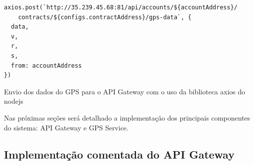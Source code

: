 \clearpage
\begin{code}
\begin{verbatim}
axios.post(`http://35.239.45.68:81/api/accounts/${accountAddress}/
	contracts/${configs.contractAddress}/gps-data`, {
  data,
  v,
  r,
  s,
  from: accountAddress
})
\end{verbatim}
\caption{Envio dos dados do GPS para o API Gateway com o uso da biblioteca axios do nodejs}
\label{lst:scih_gps_sim_diff}
\end{code}

	Nas próximas seções será detalhado a implementação dos principais componentes do sistema: API Gateway e GPS Service.

\subsection{Implementação comentada do API Gateway}

